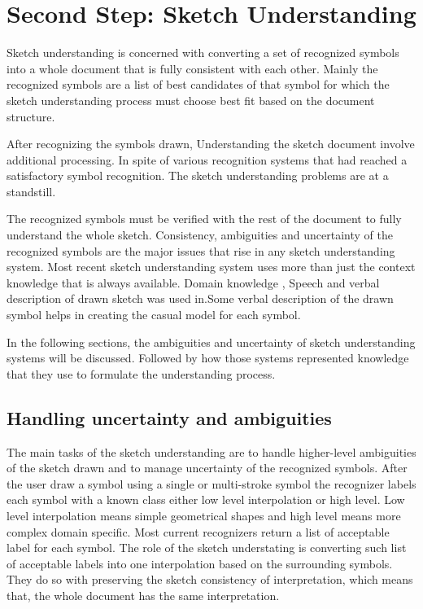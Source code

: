 \section{Second Step: Sketch Understanding}
\label{sec:SecondStep:SketchUnderstanding}


Sketch understanding is concerned with converting a set of recognized symbols into a whole document that is fully consistent with each other. Mainly the recognized symbols are a list of best candidates of that symbol for which the sketch understanding process must choose best fit based on the document structure.


After recognizing the symbols drawn, Understanding the sketch document involve additional processing. In spite of various recognition systems that had reached a satisfactory symbol recognition. The sketch understanding problems are at a standstill. 


The recognized symbols must be verified with the rest of the document to fully understand the whole sketch. Consistency, ambiguities and uncertainty of the recognized symbols are the major issues that rise in any sketch understanding system.  
Most recent sketch understanding system uses more than just the context knowledge that is always available. Domain knowledge \cite {geometrydomain49}, Speech and verbal description of drawn sketch was used in\cite {speechMulti27}.Some verbal description of the drawn symbol helps in creating the casual model for each symbol. 

In the following sections, the ambiguities and uncertainty of sketch understanding systems will be discussed. Followed by how those systems represented knowledge that they use to formulate the understanding process.

\subsection{Handling uncertainty and ambiguities }
\label{sec:Handlinguncertaintyandambiguities }

The main tasks of the sketch understanding are to handle higher-level ambiguities of the sketch drawn and to manage uncertainty of the recognized symbols. After the user draw a symbol using a single or multi-stroke symbol the recognizer labels each symbol with a known class either low level interpolation or high level. Low level interpolation means simple geometrical shapes and high level means more complex domain specific. Most current recognizers return a list of acceptable label for each symbol. The role of the sketch understating is converting such list of acceptable labels into one interpolation based on the surrounding symbols. They do so with preserving the sketch consistency of interpretation, which means that, the whole document has the same interpretation.  

